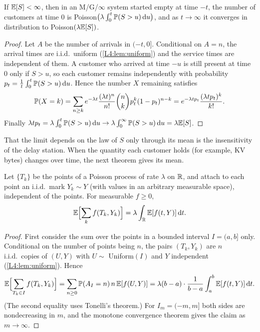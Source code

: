 \begin{proposition}\label{L4:prop:mginf}
If $\mathbb{E}[S]<\infty$, then in an M/G/$\infty$ system started empty at time $-t$, the
number of customers at time $0$ is
Poisson$\bigl(\lambda\int_0^t\mathbb{P}(S>u)\,\mathrm{d} u\bigr)$, and as $t\to\infty$ it
converges in distribution to Poisson$(\lambda\mathbb{E}[S])$.
\end{proposition}

\begin{proof}
Let $A$ be the number of arrivals in $(-t,0]$. Conditional on $A=n$, the arrival
times are i.i.d.\ uniform (\cref{L4:lem:uniform}) and the service times are
independent of them. A customer who arrived at time $-u$ is still present at time
$0$ only if $S>u$, so each customer remains independently with probability
$p_t=\frac1t\int_0^t\mathbb{P}(S>u)\,\mathrm{d} u$. Hence the number $X$ remaining satisfies
\[
  \mathbb{P}(X=k)=\sum_{n\ge k}e^{-\lambda t}\frac{(\lambda t)^n}{n!}\binom nk p_t^k(1-p_t)^{n-k}
  =e^{-\lambda tp_t}\frac{(\lambda tp_t)^k}{k!} .
\]
Finally $\lambda tp_t=\lambda\int_0^t\mathbb{P}(S>u)\,\mathrm{d} u\to\lambda\int_0^\infty\mathbb{P}(S>u)\,\mathrm{d} u=\lambda\mathbb{E}[S]$.
\end{proof}

That the limit depends on the law of $S$ only through its mean is the
insensitivity of the delay station. When the quantity each customer holds (for
example, KV bytes) changes over time, the next theorem gives its mean.

\begin{theorem}\label{thm:campbell}
Let $\{T_k\}$ be the points of a Poisson process of rate $\lambda$ on $\mathbb{R}$, and
attach to each point an i.i.d.\ mark $Y_k\sim Y$ (with values in an arbitrary
measurable space), independent of the points. For measurable $f\ge0$,
\[
  \mathbb{E}\Bigl[\sum_k f(T_k,Y_k)\Bigr]=\lambda\int_{\mathbb{R}}\mathbb{E}[f(t,Y)]\,\mathrm{d} t .
\]
\end{theorem}

\begin{proof}
First consider the sum over the points in a bounded interval $I=(a,b]$ only.
Conditional on the number of points being $n$, the pairs $(T_k,Y_k)$ are $n$
i.i.d.\ copies of $(U,Y)$ with $U\sim$ Uniform$(I)$ and $Y$ independent
(\cref{L4:lem:uniform}). Hence
\[
  \mathbb{E}\Bigl[\sum_{T_k\in I}f(T_k,Y_k)\Bigr]
  =\sum_{n\ge0}\mathbb{P}(A_I=n)\,n\,\mathbb{E}[f(U,Y)]
  =\lambda(b-a)\cdot\frac{1}{b-a}\int_a^b\mathbb{E}[f(t,Y)]\,\mathrm{d} t .
\]
(The second equality uses Tonelli's theorem.) For $I_m=(-m,m]$ both sides are
nondecreasing in $m$, and the monotone convergence theorem gives the claim as
$m\to\infty$.
\end{proof}

